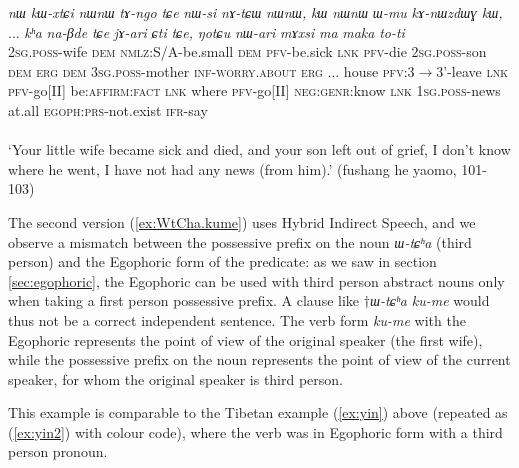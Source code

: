 \documentclass[oldfontcommands,oneside,a4paper,11pt]{article}
\newcommand{\ipa}[1]{{\phon\textit{#1}}} %
\newcommand{\refb}[1]{(\ref{#1})}
\newcommand{\bleu}[1]{{\color{blue}#1}}
\begin{document}
\begin{exe}
\ex \label{ex:atCha.kume}
 \gll \ipa{``nɤ-rʑaβ} 	\ipa{nɯ} 	\ipa{kɯ-xtɕi} 	\ipa{nɯnɯ} 	\ipa{tɤ-ngo} 	\ipa{tɕe} 	\ipa{nɯ-si} 	\ipa{nɤ-tɕɯ} 	\ipa{nɯnɯ,} 	\ipa{kɯ} 	\ipa{nɯnɯ} 	\ipa{ɯ-mu} 	\ipa{kɤ-nɯzdɯɣ} 	\ipa{kɯ,} 	... 	\ipa{kʰa} 	\ipa{na-βde} 	\ipa{tɕe} 	 	\ipa{jɤ-ari} 	\ipa{ɕti} 	\ipa{tɕe,} 	\ipa{ŋotɕu} 	\ipa{nɯ-ari} 	\ipa{mɤxsi} 	\ipa{ma} 	\bleu{\ipa{a-tɕʰa}} 	\ipa{maka} 	\bleu{\ipa{ku-me"}} 	\ipa{to-ti}  \\
\textsc{2sg.poss}-wife \textsc{dem} \textsc{nmlz}:S/A-be.small \textsc{dem} \textsc{pfv}-be.sick \textsc{lnk} \textsc{pfv}-die \textsc{2sg.poss}-son \textsc{dem} \textsc{erg} \textsc{dem} \textsc{3sg.poss}-mother \textsc{inf}-\textsc{worry.about}  \textsc{erg} ... house \textsc{pfv}:3$\rightarrow$3'-leave \textsc{lnk} \textsc{pfv}-go[II] be:\textsc{affirm:fact} \textsc{lnk} where \textsc{pfv}-go[II] \textsc{neg:genr}:know \textsc{lnk} \bleu{\textsc{1sg.poss}-news} at.all \bleu{\textsc{egoph:prs}-not.exist} \textsc{ifr}-say \\
\\
\glt `Your little wife became sick and died, and your son left out of grief, I don't know where he went, I have not had any news (from him).' (fushang he yaomo, 101-103)
\end{exe}

The second version \refb{ex:WtCha.kume} uses Hybrid Indirect Speech, and we observe a mismatch between the possessive prefix on the noun \ipa{ɯ-tɕʰa} (third person) and the Egophoric form of the predicate: as we saw in section \ref{sec:egophoric}, the Egophoric can be used with third person abstract nouns only when taking a first person possessive prefix. A clause like $\dagger$\ipa{ɯ-tɕʰa} 	\ipa{ku-me} would thus not be a correct independent sentence. The verb form \ipa{ku-me} with the Egophoric represents the point of view of the original speaker (the first wife), while the possessive prefix on the noun represents the point of view of the current speaker, for whom the original speaker is third person. 

This example is comparable to the Tibetan example \refb{ex:yin} above (repeated as \refb{ex:yin2} with colour code), where the verb was in Egophoric form with a third person pronoun.
\end{document}
